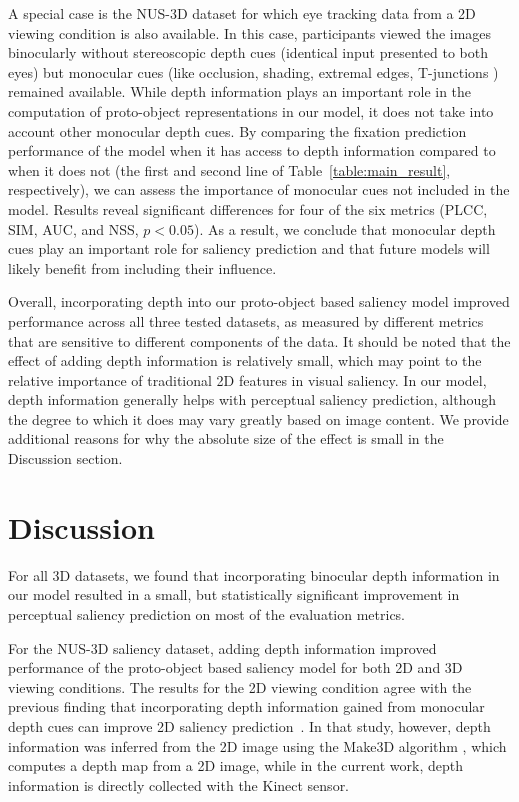 A special case is the NUS-3D dataset for which eye tracking data from a 2D viewing condition is also available. In this case, participants viewed the images binocularly without stereoscopic depth cues (identical input presented to both eyes) but monocular cues (like occlusion, shading, extremal edges, T-junctions \etc) remained available. While depth information plays an important role in the computation of proto-object representations in our model, it does not take into account other monocular depth cues. By comparing the fixation prediction performance of the model when it has access to depth information compared to when it does not (the first and second line of Table~\ref{table:main_result}, respectively), we can assess the importance of monocular cues not included in the model. Results reveal significant differences for four of the six metrics (PLCC, SIM, AUC, and NSS, $p < 0.05$). As a result, we conclude that monocular depth cues play an important role for saliency prediction and that future models will likely benefit from including their influence.

Overall, incorporating depth into our proto-object based saliency model improved performance across all three tested datasets, as measured by different metrics that are sensitive to different components of the data. It should be noted that the effect of adding depth information is relatively small, which may point to the relative
importance of traditional 2D features in visual saliency. In our model, depth information generally helps with perceptual saliency
prediction, although the degree to which it does may vary greatly based on image content. We provide additional reasons for why the absolute size of the effect is small in the Discussion section. 

\section{Discussion}
For all 3D datasets, we found that incorporating binocular depth information in our model resulted in a small, but statistically significant improvement in perceptual saliency prediction on most of
the evaluation metrics.

For the NUS-3D saliency dataset, adding depth information improved performance of the proto-object based saliency model for both 2D and
3D viewing conditions. The results for the 2D viewing condition 
agree with the previous finding that incorporating depth information gained from monocular depth cues can improve 2D saliency prediction~\citep{Ramenahalli_etal13}. In that study, however, depth information was inferred from the 2D image using the Make3D algorithm \citep{Saxena_etal09}, which computes a depth map from a 2D image, while in the current work, depth information is directly collected with the Kinect sensor.

